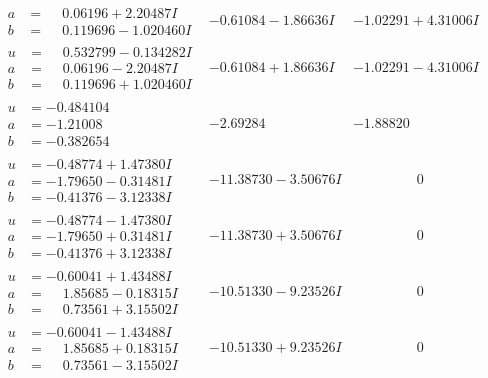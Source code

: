 \documentclass[1p]{elsarticle_modified}
\theoremstyle{definition}
\begin{document}
$$\begin{array}{c|c|c}
\begin{aligned}
a &= \phantom{-}0.06196 + 2.20487 I \\
b &= \phantom{-}0.119696 - 1.020460 I\end{aligned}
 & -0.61084 - 1.86636 I & -1.02291 + 4.31006 I \\ \hline\begin{aligned}
u &= \phantom{-}0.532799 - 0.134282 I \\
a &= \phantom{-}0.06196 - 2.20487 I \\
b &= \phantom{-}0.119696 + 1.020460 I\end{aligned}
 & -0.61084 + 1.86636 I & -1.02291 - 4.31006 I \\ \hline\begin{aligned}
u &= -0.484104\phantom{ +0.000000I} \\
a &= -1.21008\phantom{ +0.000000I} \\
b &= -0.382654\phantom{ +0.000000I}\end{aligned}
 & -2.69284\phantom{ +0.000000I} & -1.88820\phantom{ +0.000000I} \\ \hline\begin{aligned}
u &= -0.48774 + 1.47380 I \\
a &= -1.79650 - 0.31481 I \\
b &= -0.41376 - 3.12338 I\end{aligned}
 & -11.38730 - 3.50676 I & \phantom{-0.000000 } 0 \\ \hline\begin{aligned}
u &= -0.48774 - 1.47380 I \\
a &= -1.79650 + 0.31481 I \\
b &= -0.41376 + 3.12338 I\end{aligned}
 & -11.38730 + 3.50676 I & \phantom{-0.000000 } 0 \\ \hline\begin{aligned}
u &= -0.60041 + 1.43488 I \\
a &= \phantom{-}1.85685 - 0.18315 I \\
b &= \phantom{-}0.73561 + 3.15502 I\end{aligned}
 & -10.51330 - 9.23526 I & \phantom{-0.000000 } 0 \\ \hline\begin{aligned}
u &= -0.60041 - 1.43488 I \\
a &= \phantom{-}1.85685 + 0.18315 I \\
b &= \phantom{-}0.73561 - 3.15502 I\end{aligned}
 & -10.51330 + 9.23526 I & \phantom{-0.000000 } 0 \\ \hline\begin{aligned}

\end{aligned}
\end{array}$$
\end{document}
